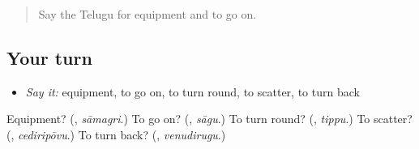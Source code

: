 \label{lesson:TE-R493-review-final-493}



\begin{quote}
Say the Telugu for equipment and to go on.
\end{quote}

\subsection*{Your turn}
\begin{itemize}
\raggedright
  \item \emph{Say it:} equipment, to go on, to turn round, to scatter, to turn back
\end{itemize}

\begin{tcolorbox}[breakable,colback=teal!4,colframe=teal!35!black,title={Before you move on}]
Equipment? (\textbf{}, \emph{sāmagri}.) To go on? (\textbf{}, \emph{sāgu}.) To turn round? (\textbf{}, \emph{tippu}.) To scatter? (\textbf{}, \emph{cediripōvu}.) To turn back? (\textbf{}, \emph{venudirugu}.)
\end{tcolorbox}
